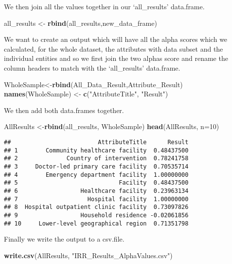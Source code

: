\documentclass[]{article}
\newenvironment{Shaded}{\begin{snugshade}}{\end{snugshade}}
\newcommand{\KeywordTok}[1]{\textcolor[rgb]{0.13,0.29,0.53}{\textbf{#1}}}
\newcommand{\DataTypeTok}[1]{\textcolor[rgb]{0.13,0.29,0.53}{#1}}
\newcommand{\DecValTok}[1]{\textcolor[rgb]{0.00,0.00,0.81}{#1}}
\newcommand{\StringTok}[1]{\textcolor[rgb]{0.31,0.60,0.02}{#1}}
\newcommand{\NormalTok}[1]{#1}
\begin{document}
We then join all the values together in our `all\_results' data.frame.

\begin{Shaded}
\begin{Highlighting}[]
\NormalTok{all_results <-}\StringTok{ }\KeywordTok{rbind}\NormalTok{(all_results,new_data_frame)}
\end{Highlighting}
\end{Shaded}

We want to create an output which will have all the alpha scores which
we calculated, for the whole dataset, the attributes with data subset
and the individual entities and so we first join the two alphas score
and rename the column headers to match with the `all\_results'
data.frame.

\begin{Shaded}
\begin{Highlighting}[]
\NormalTok{WholeSample<-}\KeywordTok{rbind}\NormalTok{(All_Data_Result,Attribute_Result)}
\KeywordTok{names}\NormalTok{(WholeSample) <-}\StringTok{ }\KeywordTok{c}\NormalTok{(}\StringTok{"AttributeTitle"}\NormalTok{, }\StringTok{"Result"}\NormalTok{)}
\end{Highlighting}
\end{Shaded}

We then add both data.frames together.

\begin{Shaded}
\begin{Highlighting}[]
\NormalTok{AllResults <-}\KeywordTok{rbind}\NormalTok{(all_results, WholeSample)}
\KeywordTok{head}\NormalTok{(AllResults, }\DataTypeTok{n=}\DecValTok{10}\NormalTok{)}
\end{Highlighting}
\end{Shaded}

\begin{verbatim}
##                         AttributeTitle      Result
## 1        Community healthcare facility  0.48437500
## 2              Country of intervention  0.78241758
## 3     Doctor-led primary care facility  0.70535714
## 4        Emergency department facility  1.00000000
## 5                             Facility  0.48437500
## 6                  Healthcare facility  0.23963134
## 7                    Hospital facility  1.00000000
## 8  Hospital outpatient clinic facility  0.73097826
## 9                  Household residence -0.02061856
## 10     Lower-level geographical region  0.71351798
\end{verbatim}

Finally we write the output to a csv.file.

\begin{Shaded}
\begin{Highlighting}[]
\KeywordTok{write.csv}\NormalTok{(AllResults, }\StringTok{"IRR_Results_AlphaValues.csv"}\NormalTok{)}
\end{Highlighting}
\end{Shaded}
\end{document}
